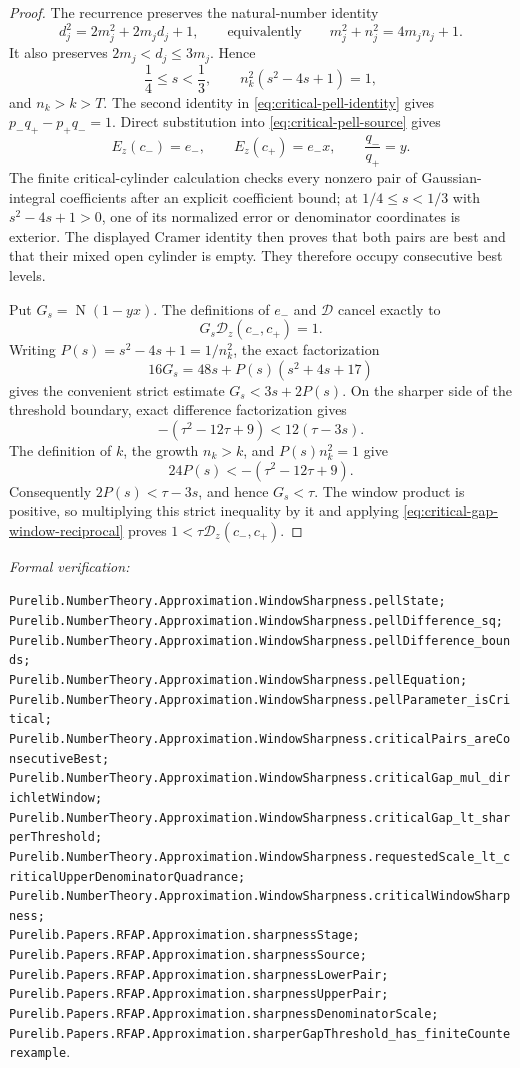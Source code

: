 \documentclass[11pt]{article}
\newcommand{\Norm}[1]{\operatorname{N}\!\left(#1\right)}
\newcommand{\leanref}[1]{\par\smallskip\noindent
  \emph{Formal verification:}\par\nobreak
  {\raggedright\nolinkurl{#1}.\par}}
\begin{document}
\begin{proof}
The recurrence preserves the natural-number identity
\begin{equation}
\label{eq:critical-pell-identity}
 d_j^2=2m_j^2+2m_jd_j+1,
 \qquad\text{equivalently}\qquad
 m_j^2+n_j^2=4m_jn_j+1.
\end{equation}
It also preserves $2m_j<d_j\le3m_j$.  Hence
\[
 \frac14\le s<\frac13,
 \qquad
 n_k^2(s^2-4s+1)=1,
\]
and $n_k>k>T$.  The second identity in
\eqref{eq:critical-pell-identity} gives
$p_-q_+-p_+q_-=1$.  Direct substitution into
\eqref{eq:critical-pell-source} gives
\[
 E_z(c_-)=e_-,
 \qquad E_z(c_+)=e_-x,
 \qquad \frac{q_-}{q_+}=y.
\]
The finite critical-cylinder calculation checks every nonzero pair of
Gaussian-integral coefficients after an explicit coefficient bound; at
$1/4\le s<1/3$ with $s^2-4s+1>0$, one of its normalized error or denominator
coordinates is exterior.  The displayed Cramer identity then proves that
both pairs are best and that their mixed open cylinder is empty.  They
therefore occupy consecutive best levels.

Put $G_s=\Norm{1-yx}$.  The definitions of $e_-$ and $\mathcal D$ cancel
exactly to
\begin{equation}
\label{eq:critical-gap-window-reciprocal}
             G_s\mathcal D_z(c_-,c_+)=1.
\end{equation}
Writing $P(s)=s^2-4s+1=1/n_k^2$, the exact factorization
\[
 16G_s=48s+P(s)(s^2+4s+17)
\]
gives the convenient strict estimate $G_s<3s+2P(s)$.  On the sharper side
of the threshold boundary, exact difference factorization gives
\[
 -(\tau^2-12\tau+9)<12(\tau-3s).
\]
The definition of $k$, the growth $n_k>k$, and $P(s)n_k^2=1$ give
\[
 24P(s)<-(\tau^2-12\tau+9).
\]
Consequently $2P(s)<\tau-3s$, and hence $G_s<\tau$.  The window product is
positive, so multiplying this strict inequality by it and applying
\eqref{eq:critical-gap-window-reciprocal} proves
$1<\tau\mathcal D_z(c_-,c_+)$.
\end{proof}

\leanref{Purelib.NumberTheory.Approximation.WindowSharpness.pellState;
Purelib.NumberTheory.Approximation.WindowSharpness.pellDifference_sq;
Purelib.NumberTheory.Approximation.WindowSharpness.pellDifference_bounds;
Purelib.NumberTheory.Approximation.WindowSharpness.pellEquation;
Purelib.NumberTheory.Approximation.WindowSharpness.pellParameter_isCritical;
Purelib.NumberTheory.Approximation.WindowSharpness.criticalPairs_areConsecutiveBest;
Purelib.NumberTheory.Approximation.WindowSharpness.criticalGap_mul_dirichletWindow;
Purelib.NumberTheory.Approximation.WindowSharpness.criticalGap_lt_sharperThreshold;
Purelib.NumberTheory.Approximation.WindowSharpness.requestedScale_lt_criticalUpperDenominatorQuadrance;
Purelib.NumberTheory.Approximation.WindowSharpness.criticalWindowSharpness;
Purelib.Papers.RFAP.Approximation.sharpnessStage;
Purelib.Papers.RFAP.Approximation.sharpnessSource;
Purelib.Papers.RFAP.Approximation.sharpnessLowerPair;
Purelib.Papers.RFAP.Approximation.sharpnessUpperPair;
Purelib.Papers.RFAP.Approximation.sharpnessDenominatorScale;
Purelib.Papers.RFAP.Approximation.sharperGapThreshold_has_finiteCounterexample}
\end{document}
